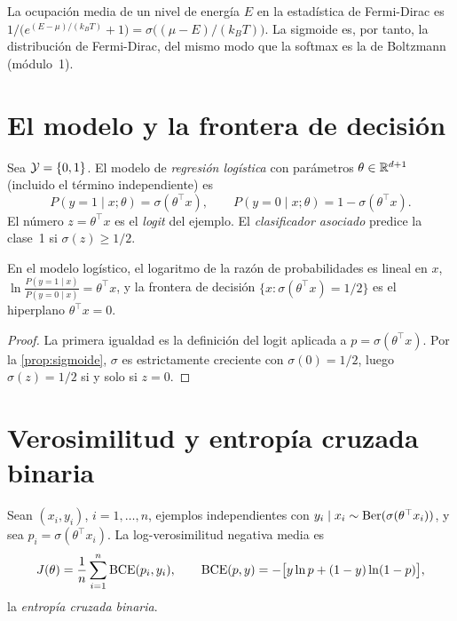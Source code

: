 \begin{observacion}[Física]
La ocupación media de un nivel de energía $E$ en la estadística de Fermi-Dirac es $1/\bigl(e^{(E-\mu)/(k_BT)}+1\bigr)=\sigma\bigl((\mu-E)/(k_BT)\bigr)$. La sigmoide es, por tanto, la distribución de Fermi-Dirac, del mismo modo que la softmax es la de Boltzmann (módulo~1).
\end{observacion}

\section{El modelo y la frontera de decisión}

\begin{definicion}\label{def:logistica}
Sea $\mathcal{Y}=\{0,1\}$. El modelo de \emph{regresión logística} con parámetros $\theta\in\mathbb{R}^{d+1}$ (incluido el término independiente) es
\[
P(y=1\mid x;\theta)=\sigma(\theta^{\top}x),\qquad P(y=0\mid x;\theta)=1-\sigma(\theta^{\top}x).
\]
El número $z=\theta^{\top}x$ es el \emph{logit} del ejemplo. El \emph{clasificador asociado} predice la clase~1 si $\sigma(z)\ge 1/2$.
\end{definicion}

\begin{proposicion}\label{prop:frontera}
En el modelo logístico, el logaritmo de la razón de probabilidades es lineal en $x$, $\ln\frac{P(y=1\mid x)}{P(y=0\mid x)}=\theta^{\top}x$, y la frontera de decisión $\{x:\sigma(\theta^{\top}x)=1/2\}$ es el hiperplano $\theta^{\top}x=0$.
\end{proposicion}

\begin{proof}
La primera igualdad es la definición del logit aplicada a $p=\sigma(\theta^{\top}x)$. Por la \cref{prop:sigmoide}, $\sigma$ es estrictamente creciente con $\sigma(0)=1/2$, luego $\sigma(z)=1/2$ si y solo si $z=0$.
\end{proof}

\section{Verosimilitud y entropía cruzada binaria}

\begin{proposicion}\label{prop:bce}
Sean $(x_i,y_i)$, $i=1,\dots,n$, ejemplos independientes con $y_i\mid x_i\sim\operatorname{Ber}(\sigma(\theta^{\top}x_i))$, y sea $p_i=\sigma(\theta^{\top}x_i)$. La log-verosimilitud negativa media es
\[
J(\theta)=\frac{1}{n}\sum_{i=1}^{n}\operatorname{BCE}(p_i,y_i),\qquad \operatorname{BCE}(p,y)=-\bigl[y\ln p+(1-y)\ln(1-p)\bigr],
\]
la \emph{entropía cruzada binaria}.
\end{proposicion}


